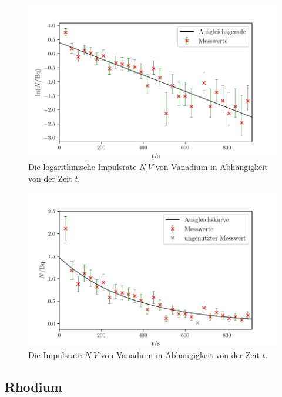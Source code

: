 \begin{figure}
	\centering
	\includegraphics[width=\linewidth-50pt,height=\textheight-50pt,keepaspectratio]{content/images/VanadiumLog.pdf}
	\caption{Die logarithmische Impulsrate $N_.V$ von Vanadium in Abhängigkeit von der Zeit $t$.}
	\label{fig:VanadiumLog}
\end{figure}

\begin{figure}
	\centering
	\includegraphics[width=\linewidth-50pt,height=\textheight-50pt,keepaspectratio]{content/images/Vanadium.pdf}
	\caption{Die Impulsrate $N_.V$ von Vanadium in Abhängigkeit von der Zeit $t$.}
	\label{fig:Vanadium}
\end{figure}


\subsection{Rhodium}

